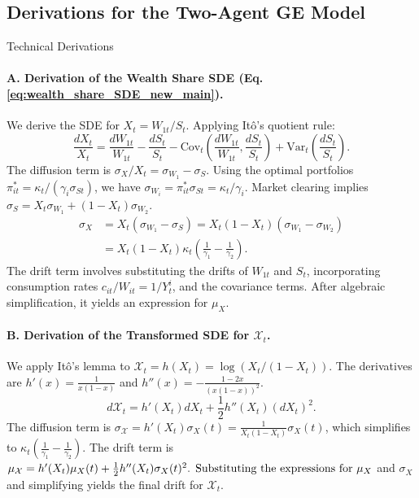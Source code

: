 \documentclass[11pt,letterpaper,oneside]{article}
\theoremstyle{plain}
\theoremstyle{definition}
\theoremstyle{remark}
\begin{document}
\subsection{Derivations for the Two-Agent GE Model}
\label{app:WealthShare}
\begin{leanproofbox}{Technical Derivations}
\paragraph{A. Derivation of the Wealth Share SDE (Eq. \ref{eq:wealth_share_SDE_new_main}).}
We derive the SDE for \(X_t = W_{1t}/S_t\). Applying Itô's quotient rule:
\begin{equation*}
\frac{dX_t}{X_t} = \frac{dW_{1t}}{W_{1t}} - \frac{dS_t}{S_t} - \text{Cov}_t\left(\frac{dW_{1t}}{W_{1t}}, \frac{dS_t}{S_t}\right) + \text{Var}_t\left(\frac{dS_t}{S_t}\right).
\end{equation*}
The diffusion term is \(\sigma_X/X_t = \sigma_{W_1} - \sigma_S\). Using the optimal portfolios \(\pi_{it}^* = \kappa_t/(\gamma_i \sigma_{St})\), we have \(\sigma_{W_i} = \pi_{it}^*\sigma_{St} = \kappa_t/\gamma_i\). Market clearing implies \(\sigma_S = X_t \sigma_{W_1} + (1-X_t)\sigma_{W_2}\).
\begin{align*}
\sigma_X &= X_t(\sigma_{W_1} - \sigma_S) = X_t(1-X_t)(\sigma_{W_1}-\sigma_{W_2}) \\
&= X_t(1-X_t)\kappa_t\left(\frac{1}{\gamma_1}-\frac{1}{\gamma_2}\right).
\end{align*}
The drift term involves substituting the drifts of \(W_{1t}\) and \(S_t\), incorporating consumption rates \(c_{it}/W_{it} = 1/Y^i_t\), and the covariance terms. After algebraic simplification, it yields an expression for $\mu_X$.

\paragraph{B. Derivation of the Transformed SDE for \(\mathcal{X}_t\).}
We apply Itô's lemma to \(\mathcal{X}_t = h(X_t) = \log(X_t/(1-X_t))\). The derivatives are \(h'(x) = \frac{1}{x(1-x)}\) and \(h''(x) = -\frac{1-2x}{(x(1-x))^2}\).
\begin{equation*}
d\mathcal{X}_t = h'(X_t) dX_t + \frac{1}{2} h''(X_t) (dX_t)^2.
\end{equation*}
The diffusion term is \(\sigma_{\mathcal{X}} = h'(X_t)\sigma_X(t) = \frac{1}{X_t(1-X_t)} \sigma_X(t)\), which simplifies to $\kappa_t(\frac{1}{\gamma_1}-\frac{1}{\gamma_2})$.
The drift term is \(\mu_{\mathcal{X}} = h'(X_t)\mu_X(t) + \frac{1}{2} h''(X_t)\sigma_X(t)^2$. Substituting the expressions for \(\mu_X\) and \(\sigma_X\) and simplifying yields the final drift for $\mathcal{X}_t$.
\end{leanproofbox}
\end{document}
